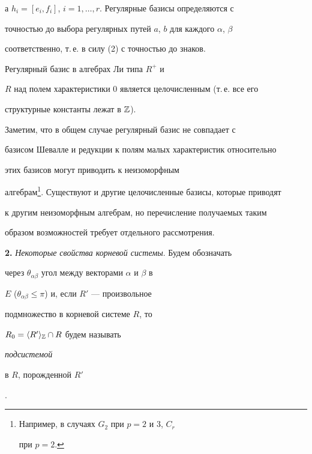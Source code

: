 а $h_i=[e_i,f_i]$, $i=1,\dotsc,r$. Регулярные базисы определяются с


точностью до выбора регулярных путей $a$, $b$ для каждого $\alpha$, $\beta$


соответственно, т.\,е. в силу (2) с точностью до знаков.





\begin{cor}


Регулярный базис в алгебрах Ли типа $R^+$ и


$R$ над полем характеристики 0 является целочисленным (т.\,е. все его


структурные константы лежат в $\Bbb Z$).


\end{cor}





Заметим, что в общем случае регулярный базис не совпадает с


базисом Шевалле и редукции к полям малых характеристик относительно


этих базисов могут приводить к неизоморфным


алгебрам\footnote{Например, в случаях $G_2$ при $p=2$ и $3$, $C_r$


при $p=2$.}. Существуют и другие целочисленные базисы, которые приводят


к другим неизоморфным алгебрам, но перечисление получаемых таким


образом возможностей требует отдельного рассмотрения.


\medskip








{\bf 2.} {\it Некоторые свойства корневой системы}. Будем обозначать


через $\theta_{\alpha\beta }$ угол между векторами $\alpha$ и $\beta$ в


$E$ ($\theta_{\alpha\beta}\le\pi$) и, если $R'$ --- произвольное


подмножество в корневой системе $R$, то


$R_0=\langle R'\rangle_{\Bbb Z}\cap R$ будем называть {\it подсистемой


в $R$, порожденной $R'$}.





